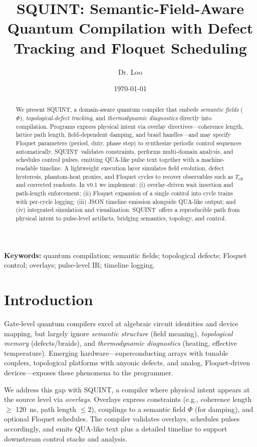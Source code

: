 \documentclass[11pt]{article}
\title{\bf SQUINT: Semantic-Field-Aware Quantum Compilation with Defect Tracking and Floquet Scheduling}
\author{Dr. Loo}
\date{\today}
\newcommand{\Teff}{T_{\mathrm{eff}}}
\newcommand{\Phif}{\Phi}
\newcommand{\SQUINT}{\textsc{SQUINT}}
\begin{document}
\maketitle

\begin{abstract}
\noindent
We present \SQUINT, a domain-aware quantum compiler that embeds \emph{semantic fields} ($\Phif$), \emph{topological-defect tracking}, and \emph{thermodynamic diagnostics} directly into compilation. Programs express physical intent via overlay directives---coherence length, lattice path length, field-dependent damping, and braid handles---and may specify Floquet parameters (period, duty, phase step) to synthesize periodic control sequences automatically. \SQUINT\ validates constraints, performs multi-domain analysis, and schedules control pulses, emitting QUA-like pulse text together with a machine-readable timeline. A lightweight execution layer simulates field evolution, defect hysteresis, phantom-heat proxies, and Floquet cycles to recover observables such as $\Teff$ and corrected readouts. In v0.1 we implement: (i) overlay-driven wait insertion and path-length enforcement; (ii) Floquet expansion of a single control into cycle trains with per-cycle logging; (iii) JSON timeline emission alongside QUA-like output; and (iv) integrated simulation and visualization. \SQUINT\ offers a reproducible path from physical intent to pulse-level artifacts, bridging semantics, topology, and control.
\end{abstract}

\vspace{1ex}
\noindent\textbf{Keywords:} quantum compilation; semantic fields; topological defects; Floquet control; overlays; pulse-level IR; timeline logging.

\section{Introduction}
Gate-level quantum compilers excel at algebraic circuit identities and device mapping, but largely ignore \emph{semantic structure} (field meaning), \emph{topological memory} (defects/braids), and \emph{thermodynamic diagnostics} (heating, effective temperature). Emerging hardware---superconducting arrays with tunable couplers, topological platforms with anyonic defects, and analog, Floquet-driven devices---exposes these phenomena to the programmer.

We address this gap with \SQUINT, a compiler where physical intent appears at the source level via \emph{overlays}. Overlays express constraints (e.g., coherence length $\ge$ \SI{120}{\nano\second}, path length $\le 2$), couplings to a semantic field $\Phif$ (for damping), and optional Floquet schedules. The compiler validates overlays, schedules pulses accordingly, and emits QUA-like text plus a detailed timeline to support downstream control stacks and analysis.
\end{document}
